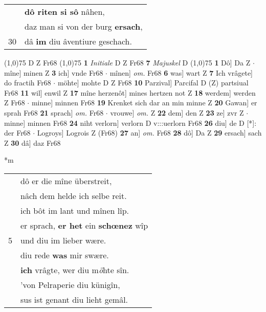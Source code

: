 \documentclass[8pt,a4paper,notitlepage]{article}
\begin{document}
\begin{table}[ht]
\begin{minipage}[t]{0.5\linewidth}
\begin{tabular}{rl}
 & \textbf{dô riten si sô} nâhen,\\ 
 & daz man si von der burg \textbf{ersach},\\ 
30 & dâ \textbf{im} diu âventiure geschach.\\ 
\end{tabular}
\scriptsize
\line(1,0){75} \newline
D Z Fr68 \newline
\line(1,0){75} \newline
\textbf{1} \textit{Initiale} D Z Fr68  \textbf{7} \textit{Majuskel} D  \newline
\line(1,0){75} \newline
\textbf{1} Dô] Da Z  $\cdot$ mîne] minen Z \textbf{3} ich] vnde Fr68  $\cdot$ mînen] \textit{om.} Fr68 \textbf{6} was] wart Z \textbf{7} Ich vrâgete] do fractih Fr68  $\cdot$ möhte] mohte D Z Fr68 \textbf{10} Parzival] Parcifal D (Z) partsiual Fr68 \textbf{11} wil] enwil Z \textbf{17} mîne herzenôt] mines hertzen not Z \textbf{18} werdem] werden Z Fr68  $\cdot$ minne] minnen Fr68 \textbf{19} Krenket sich dar an min minne Z \textbf{20} Gawan] er sprah Fr68 \textbf{21} sprach] \textit{om.} Fr68  $\cdot$ vrouwe] \textit{om.} Z \textbf{22} dem] den Z \textbf{23} ze] zvr Z  $\cdot$ minne] minnen Fr68 \textbf{24} niht verlorn] verlorn D v:::uerlorn Fr68 \textbf{26} diu] de D [*]: der Fr68  $\cdot$ Logroys] Logrois Z (Fr68) \textbf{27} an] \textit{om.} Fr68 \textbf{28} dô] Da Z \textbf{29} ersach] sach Z \textbf{30} dâ] daz Fr68 \newline
\end{minipage}
\hspace{0.5cm}
\begin{minipage}[t]{0.5\linewidth}
\small
\begin{center}*m
\end{center}
\begin{tabular}{rl}
 & dô er die mîne überstreit,\\ 
 & nâch dem helde ich selbe reit.\\ 
 & ich bôt im lant und mînen lîp.\\ 
 & er sprach, \textbf{er het} ein \textbf{schœnez} wîp\\ 
5 & und diu im lieber wære.\\ 
 & diu rede \textbf{was} mir swære.\\ 
 & \textbf{ich} vrâgte, wer diu m\textit{ö}hte sîn.\\ 
 & 'von Pelraperie diu künigîn,\\ 
 & sus ist genant diu lieht gemâl.\\ 

\end{tabular}
\end{minipage}
\end{table}
\end{document}
